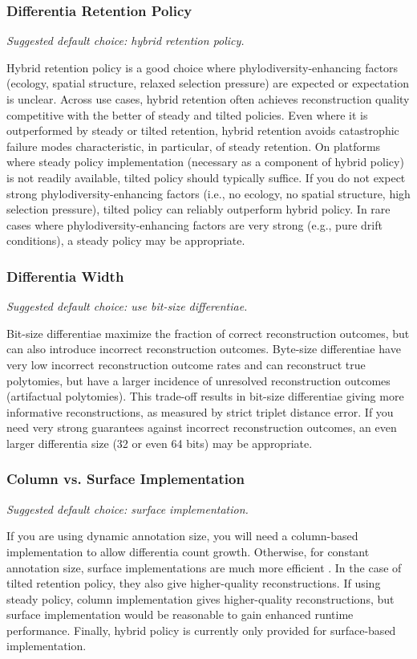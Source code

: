 \subsubsection{Differentia Retention Policy}
\textit{Suggested default choice: hybrid retention policy.}

Hybrid retention policy is a good choice where phylodiversity-enhancing factors (ecology, spatial structure, relaxed selection pressure) are expected or expectation is unclear.
Across use cases, hybrid retention often achieves reconstruction quality competitive with the better of steady and tilted policies.
Even where it is outperformed by steady or tilted retention, hybrid retention avoids catastrophic failure modes characteristic, in particular, of steady retention.
On platforms where steady policy implementation (necessary as a component of hybrid policy) is not readily available, tilted policy should typically suffice.
If you do not expect strong phylodiversity-enhancing factors (i.e., no ecology, no spatial structure, high selection pressure), tilted policy can reliably outperform hybrid policy.
In rare cases where phylodiversity-enhancing factors are very strong (e.g., pure drift conditions), a steady policy may be appropriate.

\subsubsection{Differentia Width}
\textit{Suggested default choice: use bit-size differentiae.}

Bit-size differentiae maximize the fraction of correct reconstruction outcomes, but can also introduce incorrect reconstruction outcomes.
Byte-size differentiae have very low incorrect reconstruction outcome rates and can reconstruct true polytomies, but have a larger incidence of unresolved reconstruction outcomes (artifactual polytomies).
This trade-off results in bit-size differentiae giving more informative reconstructions, as measured by strict triplet distance error.
If you need very strong guarantees against incorrect reconstruction outcomes, an even larger differentia size (32 or even 64 bits) may be appropriate.

\subsubsection{Column vs. Surface Implementation}
\textit{Suggested default choice: surface implementation.}

If you are using dynamic annotation size, you will need a column-based implementation to allow differentia count growth.
Otherwise, for constant annotation size, surface implementations are much more efficient \citep{moreno2024trackable}.
In the case of tilted retention policy, they also give higher-quality reconstructions.
If using steady policy, column implementation gives higher-quality reconstructions, but surface implementation would be reasonable to gain enhanced runtime performance.
Finally, hybrid policy is currently only provided for surface-based implementation.


